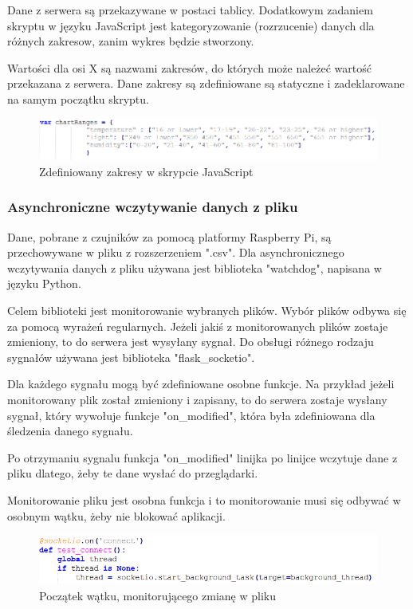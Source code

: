 \documentclass[a4paper]{article}
\begin{document}
        Dane z serwera są przekazywane w postaci tablicy. Dodatkowym zadaniem skryptu w języku JavaScript jest kategoryzowanie (rozrzucenie) danych dla różnych zakresow, zanim wykres będzie stworzony.
        
        Wartości dla osi X są nazwami zakresów, do których może należeć wartość przekazana z serwera. Dane zakresy są zdefiniowane są statyczne i zadeklarowane na samym początku skryptu.
        
        \begin{figure}[H]
            \centering
            \includegraphics[scale=0.9]{images/chartRanges.png}
            \caption{Zdefiniowany zakresy w skrypcie JavaScript}
        \end{figure}
    
    \subsubsection{Asynchroniczne wczytywanie danych z pliku}
    
        Dane, pobrane z czujników za pomocą platformy Raspberry Pi, są przechowywane w pliku z rozszerzeniem ".csv". Dla asynchronicznego wczytywania danych z pliku używana jest biblioteka "watchdog", napisana w języku Python.
        
        Celem biblioteki jest monitorowanie wybranych plików. Wybór plików odbywa się za pomocą wyrażeń regularnych. Jeżeli jakiś z monitorowanych plików zostaje zmieniony, to do serwera jest wysyłany sygnał. Do obsługi różnego rodzaju sygnałów używana jest biblioteka "flask\_socketio".
        
        Dla każdego sygnału mogą być zdefiniowane osobne funkcje. Na przykład jeżeli monitorowany plik został zmieniony i zapisany, to do serwera zostaje wysłany sygnał, który wywołuje funkcje "on\_modified", która była zdefiniowana dla śledzenia danego sygnału.
        
        Po otrzymaniu sygnalu funkcja "on\_modified" linijka po linijce wczytuje dane z pliku dlatego, żeby te dane wysłać do przeglądarki.
        
        Monitorowanie pliku jest osobna funkcja i to monitorowanie musi się odbywać w osobnym wątku, żeby nie blokować aplikacji.
        
        \begin{figure}[H]
            \centering
            \includegraphics{images/csvWatcher.png}
            \caption{Początek wątku, monitorującego zmianę w pliku}
        \end{figure}
    
\end{document}
